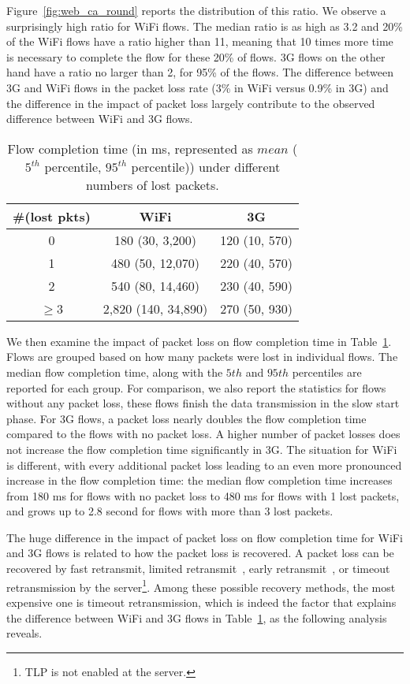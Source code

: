 Figure~\ref{fig:web_ca_round} reports the distribution of this ratio. We observe a surprisingly high ratio for WiFi flows. The median ratio is as high as 3.2 and 20\% of the WiFi flows have a ratio higher than 11, meaning that 10 times more time is necessary to complete the flow for these 20\% of flows. 3G flows on the other hand have a ratio no larger than 2, for 95\% of the flows. The difference between 3G and WiFi flows in the packet loss rate (3\% in WiFi versus 0.9\% in 3G) and the difference in the impact of packet loss largely contribute to the observed difference between WiFi and 3G flows.

\begin{table}[th]
\caption{Flow completion time (in ms, represented as $mean$ ($5^{th}$ percentile, $95^{th}$ percentile)) under different numbers of lost packets.}
\label{tab:web_loss_finish_time}
\centering
\renewcommand{\arraystretch}{1.0}
\begin{tabular}{c|c|c}
\hline
\#(lost pkts) & WiFi & 3G\\
\hline
0 & 180 (30, 3,200) & 120 (10, 570) \\
%
1 & 480 (50, 12,070) & 220 (40, 570) \\
%
2 & 540 (80, 14,460) & 230 (40, 590) \\
%
$\ge$3 & 2,820 (140, 34,890) & 270 (50, 930) \\
\hline
\end{tabular}
\minsqueeze
\end{table}

We then examine the impact of packet loss on flow completion time in Table~\ref{tab:web_loss_finish_time}. Flows are grouped based on how many packets were lost in individual flows. The median flow completion time, along with the $5th$ and $95th$ percentiles are reported for each group. For comparison, we also report the statistics for flows without any packet loss, \ie these flows finish the data transmission in the slow start phase. For 3G flows, a packet loss nearly doubles the flow completion time compared to the flows with no packet loss. A higher number of packet losses does not increase the flow completion time significantly in 3G. The situation for WiFi is different, with every additional packet loss leading to an even more pronounced increase in the flow completion time: the median flow completion time increases from 180 ms for flows with no packet loss to 480 ms for flows with 1 lost packets, and grows up to 2.8 second for flows with more than 3 lost packets. 

The huge difference in the impact of packet loss on flow completion time for WiFi and 3G flows is related to how the packet loss is recovered. A packet loss can be recovered by fast retransmit, limited retransmit~\cite{allman2001enhancing}, early retransmit~\cite{rfc5827}, or timeout retransmission by the server\footnote{TLP \cite{flach2013reducing} is not enabled at the server.}. Among these possible recovery methods, the most expensive one is timeout retransmission, which is indeed the factor that explains the difference between WiFi and 3G flows in Table~\ref{tab:web_loss_finish_time}, as the following analysis reveals.

